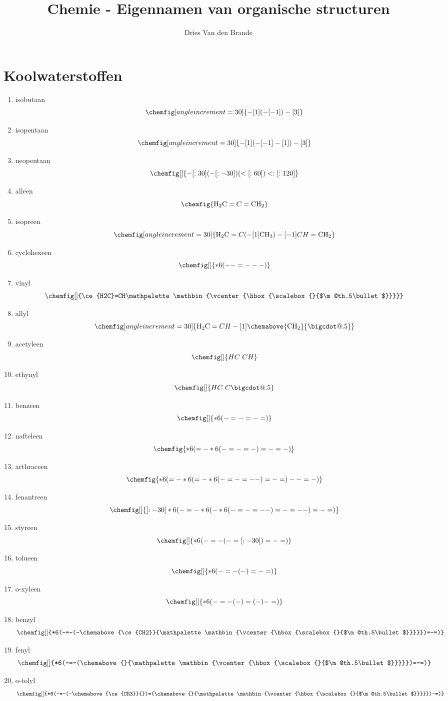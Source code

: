 \documentclass[a4paper,12pt]{article}
\makeatletter
\newcommand*\bigcdot{\mathpalette\bigcdot@{.5}}
\newcommand*\bigcdot@[2]{\mathbin{\vcenter{\hbox{\scalebox{#2}{$\m@th#1\bullet$}}}}}
\makeatother
\begin{document}
\title{Chemie - Eigennamen van organische structuren}
    \author{Dries Van den Brande}

    \maketitle

    \section*{Koolwaterstoffen}
    \begin{enumerate}
        \item isobutaan $$\chemfig[angle increment=30]{-[1](-[-1])-[3]}$$
        \item isopentaan $$\chemfig[angle increment=30]{-[1](-[-1]-[1])-[3]}$$
        \item neopentaan $$\chemfig[]{-[:30](-[:-30])(<[:60])<:[:120]}$$
        \item alleen $$\chemfig{\ce{H2C}=C=\ce{CH2}}$$
        \item isopreen $$\chemfig[angle increment=30]{\ce{H2C}=C(-[1]\ce{CH3})-[-1]CH=\ce{CH2}}$$
        \item cyclohexeen $$\chemfig[]{*6(--=---)}$$
        \item vinyl $$\chemfig[]{\ce{H2C}=CH\bigcdot{}}$$
        \item allyl $$\chemfig[angle increment=30]{\ce{H2C}=CH-[1]\chemabove{\ce{CH2}}{\bigcdot}}$$
        \item acetyleen $$\chemfig[]{HC~CH}$$
        \item ethynyl $$\chemfig[]{HC~C\bigcdot}$$
        \item benzeen $$\chemfig[]{*6(-=-=-=)}$$
        \item nafteleen $$\chemfig{*6(=-*6(-=-=-)=-=-)}$$
        \item arthraceen $$\chemfig{*6(=-*6(=-*6(-=-=--)=-=)--=-)}$$
        \item fenantreen $$\chemfig[]{[:-30]*6(-=-*6(-*6(-=-=--)=-=--)=-=)}$$
        \item styreen $$\chemfig[]{*6(-=-(-=[:-30])=-=)}$$
        \item tolueen $$\chemfig[]{*6(-=-(-)=-=)}$$
        \item o-xyleen $$\chemfig[]{*6(-=-(-)=(-)-=)}$$
        \item benzyl $$\chemfig[]{*6(-=-(-\chemabove{\ce{CH2}}{\bigcdot{}})=-=)}$$
        \item fenyl $$\chemfig[]{*6(-=-(\chemabove{}{\bigcdot{}})=-=)}$$
        \item o-tolyl $$\chemfig[]{*6(-=-(-\chemabove{\ce{CH3}}{})=(\chemabove{}{\bigcdot{}})-=)}$$
    \end{enumerate}
\end{document}
